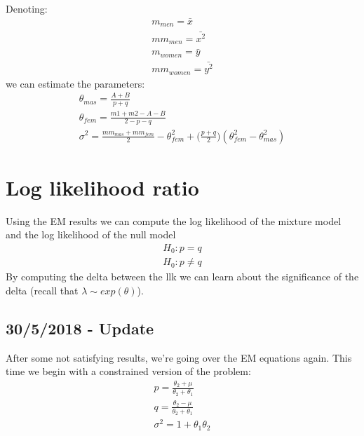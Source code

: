 \documentclass[12pt]{article}
\begin{document}
Denoting:
\begin{gather} 	
m_{men} = \bar{x} \\
mm_{men} = \bar{x^2} \\
m_{women} = \bar{y} \\
mm_{women} = \bar{y^2}
\end{gather}
we can estimate the parameters:
\begin{gather} 	
\theta_{mas} = \frac{A + B}{p + q} \\
\theta_{fem} = \frac{m1 + m2 - A - B}{2 - p - q} \\
\sigma^2 = \frac{mm_{mas} + mm_{fem}}{2} - \theta_{fem}^2 + \big(\frac{p + q}{2} \big)(\theta_{fem}^2  - \theta_{mas}^2 )
\end{gather}

\section{Log likelihood ratio} 
Using the EM results we can compute the log likelihood of the mixture model and the log likelihood of the null model	
\begin{gather*}
H_0: p = q \\
H_0: p \neq q 
\end{gather*}
By computing the delta between the llk we can learn about the significance of the delta (recall that $\lambda \sim exp(\theta)$). 

\subsection{30/5/2018 - Update}
After some not satisfying results, we're going over the EM equations again. This time we begin with a constrained version of the problem:
\begin{gather}
p = \frac{\theta_2 + \mu}{\theta_2 + \theta_1} \\
q = \frac{\theta_2 - \mu}{\theta_2 + \theta_1} \\
\sigma^2 = 1 + \theta_1 \theta_2
\end{gather}
\end{document}
